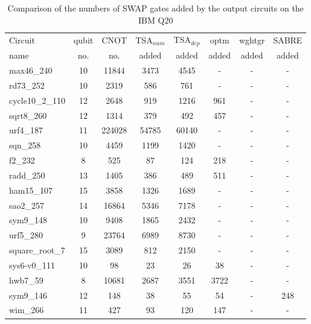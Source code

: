 \documentclass[runningheads]{llncs}
\begin{document}
		\begin{table}[!ht]
			\begin{center}  
			\begin{tabular}{|p{4.3cm}<{\centering}|c|c|c|c|c|c|c|}
			\hline
			Circuit &  qubit  & CNOT &TSA$_{num}$& TSA$_{dep}$  & optm 	 & wghtgr  &SABRE 	\\
			 name	&   no. 	&	no. & added&  added &  added 	&  added&  added\\
			\hline
			max46\_240 & 10 & 11844 & 3473 & 4545 & - & -& - \\
rd73\_252 & 10 & 2319 & 586 & 761 & - & -& - \\
cycle10\_2\_110 & 12 & 2648 & 919 & 1216 & 961 & -& - \\
sqrt8\_260 & 12 & 1314 & 379 & 492 & 457 & -& - \\
urf4\_187 & 11 & 224028 & 54785 & 60140 & - & -& - \\
sqn\_258 & 10 & 4459 & 1199 & 1420 & - & -& - \\
f2\_232 & 8 & 525 & 87 & 124 & 218 & -& - \\
radd\_250 & 13 & 1405 & 386 & 489 & 511 & -& - \\
ham15\_107 & 15 & 3858 & 1326 & 1689 & - & -& - \\
sao2\_257 & 14 & 16864 & 5346 & 7178 & - & -& - \\
sym9\_148 & 10 & 9408 & 1865 & 2432 & - & -& - \\
urf5\_280 & 9 & 23764 & 6989 & 8730 & - & -& - \\
square\_root\_7 & 15 & 3089 & 812 & 2150 & - & -& - \\
sys6-v0\_111 & 10 & 98 & 23 & 26 & 38 & -& - \\
hwb7\_59 & 8 & 10681 & 2687 & 3551 & 3722 & -& - \\
sym9\_146 & 12 & 148 & 38 & 55 & 54 & -& 248 \\
wim\_266 & 11 & 427 & 93 & 120 & 147 & -& - \\
			\hline
			\end{tabular} 
			\end{center}	
			\caption{Comparison of  the numbers of SWAP gates added by the 
			output circuits on the IBM Q20 }
			\label{tab5}  
			\end{table}
\end{document}
